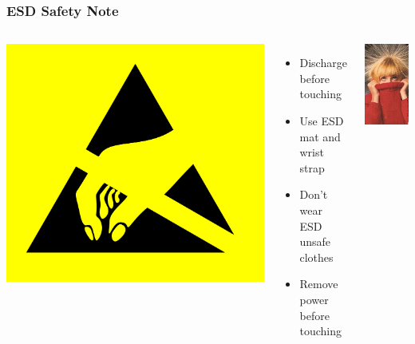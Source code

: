 \documentclass[aspectratio=169]{beamer}
\begin{document}
\begin{frame}
  \frametitle{ESD Safety Note}
  \begin{columns}
      \begin{center}
        \includegraphics[scale=0.05]{images/esd01.png}
      \end{center}
      \begin{itemize}
        \item Discharge before touching
        \item Use ESD mat and wrist strap
        \item Don't wear ESD unsafe clothes
        \item Remove power before touching
      \end{itemize}
      \begin{center}
        \includegraphics[scale=0.55]{images/esd03.jpg}
      \end{center}
  \end{columns}
\end{frame}
\end{document}
